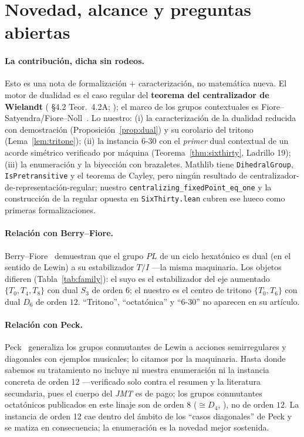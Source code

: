 \documentclass[11pt]{article}
\newcommand{\lean}[1]{\texttt{#1}}
\newcommand{\Dgrp}[1]{D_{#1}}
\begin{document}
\section{Novedad, alcance y preguntas abiertas}\label{sec:novelty}

\paragraph{La contribución, dicha sin rodeos.} Esto es una nota de formalización $+$ caracterización, no
matemática nueva. El motor de dualidad es el caso regular del \textbf{teorema del centralizador de
Wielandt} (\cite{DM} \S4.2 Teor.\ 4.2A; \cite{Cam}); el marco de los grupos contextuales es
Fiore--Satyendra/Fiore--Noll~\cite{FS,FN11,FN25}. Lo nuestro: (i) la caracterización de la dualidad
reducida con demostración (Proposición~\ref{prop:dual}) y su corolario del tritono
(Lema~\ref{lem:tritone}); (ii) la instancia 6-30 con el \emph{primer} dual contextual de un acorde
simétrico verificado por máquina (Teorema~\ref{thm:sixthirty}, Ladrillo 19); (iii) la enumeración y la
biyección con brazaletes. Mathlib tiene \lean{DihedralGroup}, \lean{IsPretransitive} y el teorema de
Cayley, pero ningún resultado de centralizador-de-representación-regular; nuestro
\lean{centralizing\_fixedPoint\_eq\_one} y la construcción de la regular opuesta en \lean{SixThirty.lean}
cubren ese hueco como primeras formalizaciones.

\paragraph{Relación con Berry--Fiore.} Berry--Fiore~\cite{BF} demuestran que el grupo $PL$ de un ciclo
hexatónico es dual (en el sentido de Lewin) a su estabilizador $T/I$ ---la misma maquinaria. Los objetos
difieren (Tabla~\ref{tab:family}): el suyo es el estabilizador del eje aumentado $\{T_0,T_4,T_8\}$ con
dual $S_3$ de orden $6$; el nuestro es el centro de tritono $\{T_0,T_6\}$ con dual $\Dgrp{6}$ de orden
$12$. ``Tritono'', ``octatónica'' y ``6-30'' no aparecen en su artículo.

\paragraph{Relación con Peck.} Peck~\cite{Peck} generaliza los grupos conmutantes de Lewin a acciones
semirregulares y diagonales con ejemplos musicales; lo citamos por la maquinaria. Hasta donde sabemos su
tratamiento no incluye ni nuestra enumeración ni la instancia concreta de orden 12 ---verificado solo
contra el resumen y la literatura secundaria, pues el cuerpo del \emph{JMT} es de pago; los grupos
conmutantes octatónicos publicados en este linaje son de orden $8$ ($\cong\Dgrp{4}$, \cite{FN11}), no de
orden $12$. La instancia de orden 12 cae dentro del ámbito de los ``casos diagonales'' de Peck y se
matiza en consecuencia; la enumeración es la novedad mejor sostenida.
\end{document}
